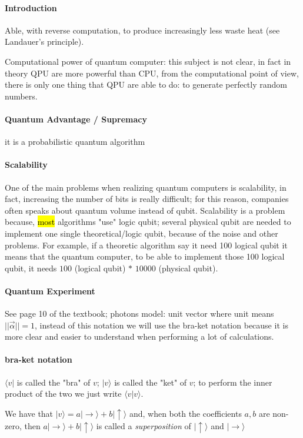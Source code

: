 \documentclass[12pt,a4paper]{report}
\begin{document}
\paragraph{Introduction}
Able, with reverse computation, to produce increasingly less waste heat (see Landauer's principle).

Computational power of quantum computer: this subject is not clear, in fact in theory QPU are more powerful than CPU, from the computational point of view, there is only one thing that  QPU are able to do: to generate perfectly random numbers.

\paragraph{Quantum Advantage / Supremacy}
it is a probabilistic quantum algorithm

\paragraph{Scalability}
One of the main problems when realizing quantum computers is scalability, in fact, increasing the number of bits is really difficult; for this reason, companies often speaks about quantum volume instead of qubit.
Scalability is a problem because, \hl{most} algorithms "use" logic qubit; several physical qubit are needed to implement one single theoretical/logic qubit, because of the noise and other problems. For example, if a theoretic algorithm say it need 100 logical qubit it means that the quantum computer, to be able to implement those 100 logical qubit, it needs $100$ (logical qubit) $*$ $10000$ (physical qubit).

\paragraph{Quantum Experiment}
See page 10 of the textbook; photons model: unit vector where unit means $||\overrightarrow{\alpha}|| = 1$, instead of this notation we will use the bra-ket notation because it is more clear and easier to understand when performing a lot of calculations.
\paragraph{bra-ket notation}
$ \langle v |$ is called the "bra" of $v$; $| v \rangle $ is called the "ket" of $v$; to perform the inner product of the two we just write $ \langle v | v \rangle $.

We have that $| v \rangle = a | \rightarrow \rangle + b | \uparrow \rangle $ and, when both the coefficients $a, b$ are non-zero, then $ a | \rightarrow \rangle + b | \uparrow \rangle $ is called a \textit{superposition} of $| \uparrow \rangle $ and $| \rightarrow \rangle $
\end{document}
